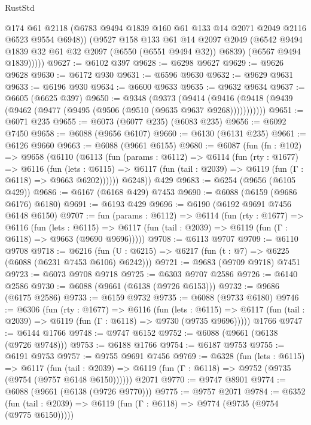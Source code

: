 \begin{lexlean}{RustStd}
\begin{coremodule}
            @174
            @61
            @2118
            (@6783 @9494 @1839 @160 @61 @133 @14 @2071 @2049 @2116 @6523 @9554 @6948))
          (@9527
            @158
            @133
            @61
            @14
            @2097
            @2049
            (@6542 @9494 @1839 @32 @61 @32 @2097 (@6550 (@6551 @9494 @32)) @6839)
            (@6567 @9494 @1839)))))
@9627 := @6102 @397
@9628 := @6298 @9627
@9629 := @9626 @9628
@9630 := @6172 @930
@9631 := @6596 @9630
@9632 := @9629 @9631
@9633 := @6196 @930
@9634 := @6600 @9633
@9635 := @9632 @9634
@9637 := @6605 (@6625 @397)
@9650 := @9348
    (@9373
      (@9414 (@9416 (@9418 (@9439 (@9462 (@9477 (@9495 (@9506 (@9510 (@9635 @9637 @9268)))))))))))
@9651 := @6071 @235
@9655 := @6073 (@6077 @235) (@6083 @235)
@9656 := @6092 @7450
@9658 := @6088 (@9656 @6107)
@9660 := @6130 (@6131 @235)
@9661 := @6126 @9660
@9663 := @6088 (@9661 @6155)
@9680 := @6087
    (fun (fn : @102) =>
    @9658
      (@6110
        (@6113
          (fun (params : @6112) =>
          @6114
            (fun (rty : @1677) =>
            @6116
              (fun (lets : @6115) =>
              @6117 (fun (tail : @2039) => @6119 (fun (Γ : @6118) => @9663 @6202))))))
        @6248))
    @429
@9683 := @6254 (@9656 (@6105 @429))
@9686 := @6167 (@6168 @429) @7453
@9690 := @6088 (@6159 (@9686 @6176) @6180)
@9691 := @6193 @429
@9696 := @6190 (@6192 @9691 @7456 @6148 @6150)
@9707 := fun (params : @6112) =>
  @6114
    (fun (rty : @1677) =>
    @6116
      (fun (lets : @6115) =>
      @6117 (fun (tail : @2039) => @6119 (fun (Γ : @6118) => @9663 (@9690 @9696)))))
@9708 := @6113 @9707
@9709 := @6110 @9708
@9718 := @6216 (fun (U : @6215) => @6217 (fun (t : @7) => @6225 (@6088 (@6231 @7453 @6106) @6242)))
@9721 := @9683 (@9709 @9718) @7451
@9723 := @6073 @9708 @9718
@9725 := @6303 @9707 @2586
@9726 := @6140 @2586
@9730 := @6088 (@9661 (@6138 (@9726 @6153)))
@9732 := @9686 (@6175 @2586)
@9733 := @6159 @9732
@9735 := @6088 (@9733 @6180)
@9746 := @6306
    (fun (rty : @1677) =>
    @6116
      (fun (lets : @6115) =>
      @6117 (fun (tail : @2039) => @6119 (fun (Γ : @6118) => @9730 (@9735 @9696)))))
    @1766
@9747 := @6144 @1766
@9748 := @9747 @6152
@9752 := @6088 (@9661 (@6138 (@9726 @9748)))
@9753 := @6188 @1766
@9754 := @6187 @9753
@9755 := @6191 @9753
@9757 := @9755 @9691 @7456
@9769 := @6328
    (fun (lets : @6115) =>
    @6117
      (fun (tail : @2039) => @6119 (fun (Γ : @6118) => @9752 (@9735 (@9754 (@9757 @6148 @6150))))))
    @2071
@9770 := @9747 @8901
@9774 := @6088 (@9661 (@6138 (@9726 @9770)))
@9775 := @9757 @2071
@9784 := @6352
    (fun (tail : @2039) => @6119 (fun (Γ : @6118) => @9774 (@9735 (@9754 (@9775 @6150)))))

\end{coremodule}
\end{lexlean}

